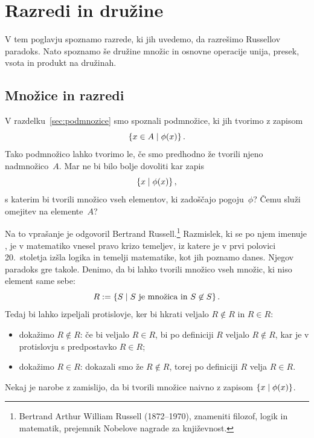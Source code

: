 \chapter{Razredi in družine}
\label{cha:razred-druzine}

V tem poglavju spoznamo razrede, ki jih uvedemo, da razrešimo Russellov paradoks. Nato spoznamo še družine množic in osnovne operacije unija, presek, vsota in produkt na družinah.

\section{Množice in razredi}
\label{sec:mnozice-in-razredi}

V razdelku~\ref{sec:podmnozice} smo spoznali podmnožice, ki jih tvorimo z zapisom
%
\begin{equation*}
    \left\{ x \in A \; \middle| \; \phi(x) \right\}.
\end{equation*}
%
Tako podmnožico lahko tvorimo le, če smo predhodno že tvorili njeno nadmnožico~$A$.
%
Mar ne bi bilo bolje dovoliti kar zapis
%
\begin{equation*}
  \left\{x \; \middle| \; \phi(x) \right\},
\end{equation*}
%
s katerim bi tvorili množico vseh elementov, ki zadoščajo pogoju~$\phi$?
%
Čemu služi omejitev na elemente~$A$?

Na to vprašanje je odgovoril Bertrand Russell.\footnote{Bertrand Arthur William Russell (1872--1970), znameniti filozof, logik in matematik, prejemnik Nobelove nagrade za književnost.}
%
Razmislek, ki se po njem imenuje , je v matematiko vnesel pravo krizo temeljev, iz katere je v prvi polovici 20.~stoletja izšla logika in temelji matematike, kot jih poznamo danes.
%
Njegov paradoks gre takole. Denimo, da bi lahko tvorili množico vseh množic, ki niso element same
sebe:
%
\begin{equation*}
    R \mathrel{{:}{=}} \left\{ S \; \middle| \; \text{$S$ je množica in $S \not\in S$} \right\}.
\end{equation*}
%
Tedaj bi lahko izpeljali protislovje, ker bi hkrati veljalo $R \not\in R$ in $R \in R$:
%
\begin{itemize}
\item dokažimo $R \not\in R$:
  če bi veljalo $R \in R$, bi po definiciji $R$ veljalo $R \not\in R$, kar
  je v protislovju s predpostavko $R \in R$;

\item
  dokažimo $R \in R$: dokazali smo že $R \not\in R$, torej po definiciji $R$ velja $R \in R$.
\end{itemize}
%
Nekaj je narobe z zamislijo, da bi tvorili množice naivno z zapisom $\left\{x \; \middle| \; \phi(x)\right\}$.

